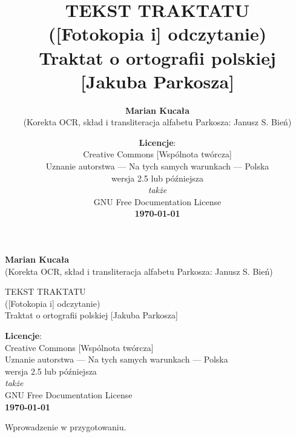 \documentclass[dvipsnames,12pt]{report}
\author{\textbf{Marian Kucała}\\(Korekta OCR, skład i transliteracja alfabetu Parkosza: Janusz S. Bień)}
\title{TEKST TRAKTATU\\[-.5ex]([Fotokopia i] odczytanie)\\[-.5ex]Traktat o ortografii polskiej [Jakuba Parkosza]}
\date{\textbf{Licencje}:\\ \relsize{-1}Creative Commons [Wspólnota twórcza]\\[-.4ex]
Uznanie autorstwa --- Na tych samych warunkach --- Polska\\
wersja 2.5 lub późniejsza\\\textit{także}\\
GNU Free Documentation License\\
\textbf{\today}}
\begin{document}
\thispagestyle{empty}

\begin{titlepage}
{\textbf{Marian Kucała}\\(Korekta OCR, skład i transliteracja alfabetu Parkosza: Janusz S. Bień)} 

\vfill
{
{TEKST TRAKTATU\\[-.5ex]([Fotokopia i] odczytanie)\\[-.5ex]Traktat o ortografii polskiej [Jakuba Parkosza]}}

\vfill
{\textbf{Licencje}:\\ Creative Commons [Wspólnota twórcza]\\[-.4ex]
Uznanie autorstwa --- Na tych samych warunkach --- Polska\\
wersja 2.5 lub późniejsza\\\textit{także}\\
GNU Free Documentation License\\
\textbf{\today}}

\end{titlepage}

{}



Wprowadzenie w przygotowaniu.


\raggedright

\newpage
{}
{}
{}
 
 \newpage
{}
 
 \newpage
{}
 
 \newpage
{}
 
\newpage
{}

\newpage
{}

\newpage
{}
 
\newpage
{}
 
\newpage
{}
 
\newpage
{}
 
\newpage
{}
 
\newpage
{}
 
\newpage
{}
 
\newpage
{}
 

 \everypar{}
\newpage
\tableofcontents
\printbibliography
\end{document}

